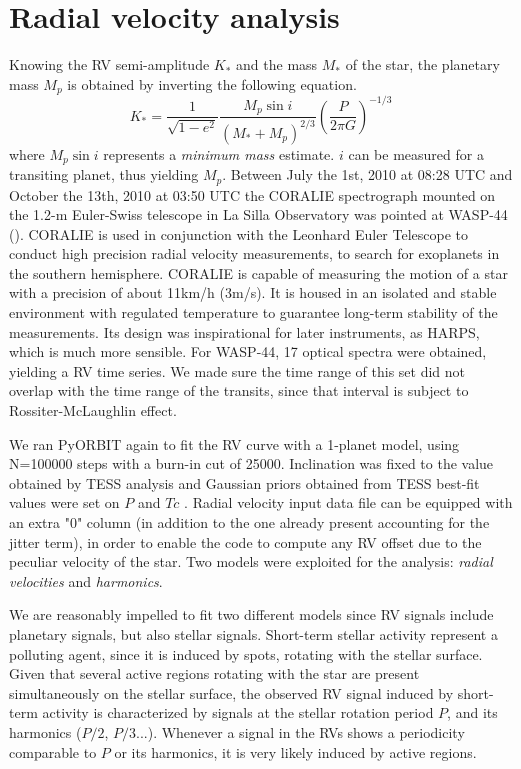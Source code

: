 \documentclass{aa}
\begin{document}
\section{Radial velocity analysis}
Knowing the RV semi-amplitude $K_*$ and the mass $M_*$ of the star,
the planetary mass $M_p$ is obtained by inverting the following equation. 
\begin{equation}
    K_* = \frac{1}{\sqrt{1-e^2}}\frac{M_p \sin{i}}{(M_*+M_p)^{2/3}}\left(\frac{P}{2\pi G}\right)^{-1/3}
\end{equation}
where $M_p\sin{i}$ represents a \textit{minimum mass} estimate. $i$ can be 
measured for a transiting planet, thus yielding $M_p$. Between 	July the 1st, 2010 at 08:28 UTC and October the 13th, 2010 at 03:50 UTC the CORALIE spectrograph mounted on the 1.2-m Euler-Swiss telescope in La Silla Observatory was pointed at WASP-44 (\cite{Anderson}). CORALIE is used in conjunction with the Leonhard Euler Telescope to conduct high precision radial velocity measurements, to search for exoplanets in the southern hemisphere. CORALIE is capable of measuring the motion of a star with a precision of about 11km/h (3m/s). It is housed in an isolated and stable environment with regulated temperature to guarantee long-term stability of the measurements. Its design was inspirational for later instruments, as HARPS, which is much more sensible.
For WASP-44, 17 optical spectra were obtained, yielding a RV time series. We made sure the time range of this set did not overlap with the time range of the transits, since that interval is subject to Rossiter-McLaughlin effect.

We ran PyORBIT again to fit the RV curve with a 1-planet model, using N=100000 steps with a burn-in cut of 25000. Inclination was fixed to the value obtained by TESS analysis and Gaussian priors obtained from TESS best-fit values were set on $P$ and $Tc$ .
Radial velocity input data file can be equipped with an extra "0" column (in addition to the one already present accounting for the jitter term), in order to enable the code to compute any RV offset due to the peculiar velocity of the star.
Two models were exploited for the analysis: \textit{radial velocities} and 
\textit{harmonics}. 

We are reasonably impelled to fit two different models since RV signals include planetary signals, 
but also stellar signals. Short-term stellar activity represent a polluting agent, since it is 
induced by spots, rotating with the stellar surface. Given that several active regions rotating 
with the star are present simultaneously on the stellar surface, the observed RV signal 
induced by short-term activity is characterized by signals at the stellar rotation period 
$P$, and its harmonics ($P/2$, $P/3$...). Whenever a signal in the RVs shows a periodicity 
comparable to $P$ or its harmonics, it is very likely induced by active regions. 
\end{document}
